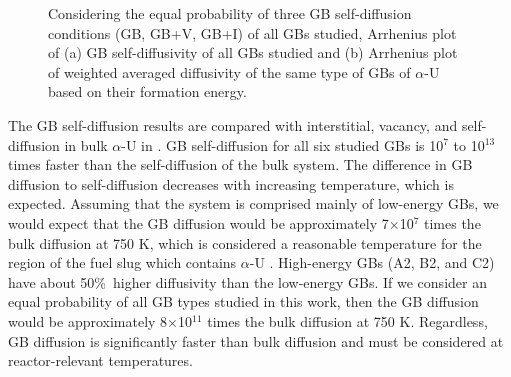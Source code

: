 \documentclass[review]{elsarticle}
\providecommand{\DIFaddbeginFL}{} %
\providecommand{\DIFaddendFL}{} %
\providecommand{\DIFdelbeginFL}{} %
\providecommand{\DIFdelendFL}{} %
\newcommand{\DIFscaledelfig}{0.5}
\newlength{\DIFdelgraphicswidth} %
\newlength{\DIFdelgraphicsheight} %
\newcommand{\DIFaddincludegraphics}[2][]{{\color{blue}\fbox{\DIFOincludegraphics[#1]{#2}}}} %
\newcommand{\DIFdelincludegraphics}[2][]{%
\sbox{\DIFdelgraphicsbox}{\DIFOincludegraphics[#1]{#2}}%
\settoboxwidth{\DIFdelgraphicswidth}{\DIFdelgraphicsbox} %
\settoboxtotalheight{\DIFdelgraphicsheight}{\DIFdelgraphicsbox} %
\scalebox{\DIFscaledelfig}{%
\parbox[b]{\DIFdelgraphicswidth}{\usebox{\DIFdelgraphicsbox}\\[-\baselineskip] \rule{\DIFdelgraphicswidth}{0em}}\llap{\resizebox{\DIFdelgraphicswidth}{\DIFdelgraphicsheight}{%
\setlength{\unitlength}{\DIFdelgraphicswidth}%
\begin{picture}(1,1)%
\thicklines\linethickness{2pt} %
{\color[rgb]{1,0,0}\put(0,0){\framebox(1,1){}}}%
{\color[rgb]{1,0,0}\put(0,0){\line( 1,1){1}}}%
{\color[rgb]{1,0,0}\put(0,1){\line(1,-1){1}}}%
\end{picture}%
}\hspace*{3pt}}} %
} %
\DeclareRobustCommand{\DIFaddbeginFL}{\DIFOaddbeginFL \let\includegraphics\DIFaddincludegraphics} %
\DeclareRobustCommand{\DIFaddendFL}{\DIFOaddendFL \let\includegraphics\DIFOincludegraphics} %
\DeclareRobustCommand{\DIFdelbeginFL}{\DIFOdelbeginFL \let\includegraphics\DIFdelincludegraphics} %
\DeclareRobustCommand{\DIFdelendFL}{\DIFOaddendFL \let\includegraphics\DIFOincludegraphics} %
\begin{document}
\begin{figure}[h!]
\centering
\DIFdelbeginFL %
\DIFdelendFL \DIFaddbeginFL {}
\DIFaddendFL \caption{Considering the equal probability of three GB self-diffusion conditions (GB, GB+V, GB+I) of all GBs studied, Arrhenius plot of (a) GB self-diffusivity of all GBs studied and (b) Arrhenius plot of weighted averaged diffusivity of the same type of GBs of $\alpha$-U based on their formation energy.}
\label{fig:final}
\end{figure}

The GB self-diffusion results are compared with interstitial, vacancy, and self-diffusion in bulk $\alpha$-U in  \cite{WANG2023154289}. GB self-diffusion for all six studied GBs is 10${^7}$ to 10$^{13}$ times faster than the self-diffusion of the bulk system. The difference in GB diffusion to self-diffusion decreases with increasing temperature, which is expected. Assuming that the system is comprised mainly of low-energy GBs, we would expect that the GB diffusion would be approximately 7$\times$10$^{7}$ times the bulk diffusion at 750 K, which is considered a reasonable temperature for the region of the fuel slug which contains $\alpha$-U \cite{KIM200617}. High-energy GBs (A2, B2, and C2) have about 50\%\ higher diffusivity than the low-energy GBs. If we consider an equal probability of all GB types studied in this work, then the GB diffusion would be approximately 8$\times$10$^{11}$ times the bulk diffusion at 750 K. Regardless, GB diffusion is significantly faster than bulk diffusion and must be considered at reactor-relevant temperatures. 
\end{document}
